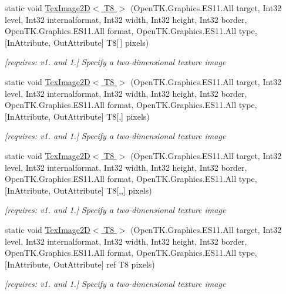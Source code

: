 \begin{DoxyCompactItemize}
static void \hyperlink{class_open_t_k_1_1_graphics_1_1_e_s11_1_1_g_l_a546856c5635682d012e635511ed54e09}{Tex\-Image2\-D$<$ T8 $>$} (Open\-T\-K.\-Graphics.\-E\-S11.\-All target, Int32 level, Int32 internalformat, Int32 width, Int32 height, Int32 border, Open\-T\-K.\-Graphics.\-E\-S11.\-All format, Open\-T\-K.\-Graphics.\-E\-S11.\-All type, \mbox{[}In\-Attribute, Out\-Attribute\mbox{]} T8\mbox{[}$\,$\mbox{]} pixels)
\begin{DoxyCompactList}\small\item\em \mbox{[}requires\-: v1. and 1.\mbox{]} Specify a two-\/dimensional texture image \end{DoxyCompactList}\item 
static void \hyperlink{class_open_t_k_1_1_graphics_1_1_e_s11_1_1_g_l_ad751ff5e5b5a960ca361c8d21f44eb0a}{Tex\-Image2\-D$<$ T8 $>$} (Open\-T\-K.\-Graphics.\-E\-S11.\-All target, Int32 level, Int32 internalformat, Int32 width, Int32 height, Int32 border, Open\-T\-K.\-Graphics.\-E\-S11.\-All format, Open\-T\-K.\-Graphics.\-E\-S11.\-All type, \mbox{[}In\-Attribute, Out\-Attribute\mbox{]} T8\mbox{[},\mbox{]} pixels)
\begin{DoxyCompactList}\small\item\em \mbox{[}requires\-: v1. and 1.\mbox{]} Specify a two-\/dimensional texture image \end{DoxyCompactList}\item 
static void \hyperlink{class_open_t_k_1_1_graphics_1_1_e_s11_1_1_g_l_aca26263275f4bbfae54ac2c7261d9eaf}{Tex\-Image2\-D$<$ T8 $>$} (Open\-T\-K.\-Graphics.\-E\-S11.\-All target, Int32 level, Int32 internalformat, Int32 width, Int32 height, Int32 border, Open\-T\-K.\-Graphics.\-E\-S11.\-All format, Open\-T\-K.\-Graphics.\-E\-S11.\-All type, \mbox{[}In\-Attribute, Out\-Attribute\mbox{]} T8\mbox{[},,\mbox{]} pixels)
\begin{DoxyCompactList}\small\item\em \mbox{[}requires\-: v1. and 1.\mbox{]} Specify a two-\/dimensional texture image \end{DoxyCompactList}\item 
static void \hyperlink{class_open_t_k_1_1_graphics_1_1_e_s11_1_1_g_l_a869b2ff6efa4b9672a9318030a307cb0}{Tex\-Image2\-D$<$ T8 $>$} (Open\-T\-K.\-Graphics.\-E\-S11.\-All target, Int32 level, Int32 internalformat, Int32 width, Int32 height, Int32 border, Open\-T\-K.\-Graphics.\-E\-S11.\-All format, Open\-T\-K.\-Graphics.\-E\-S11.\-All type, \mbox{[}In\-Attribute, Out\-Attribute\mbox{]} ref T8 pixels)
\begin{DoxyCompactList}\small\item\em \mbox{[}requires\-: v1. and 1.\mbox{]} Specify a two-\/dimensional texture image \end{DoxyCompactList}\item 

\end{DoxyCompactItemize}

